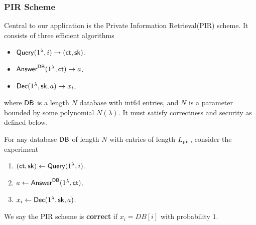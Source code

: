 \subsubsection{PIR Scheme}
\label{subsec:PIR}
Central to our application is the Private Information Retrieval(PIR) scheme. It consists of three efficient algorithms
\begin{itemize}
    \item $\mathsf{Query}(1^{\lambda}, i) \to (\mathsf{ct}, {\mathsf{sk}})$.
    \item $\mathsf{Answer}^{\mathsf{DB}}(1^{\lambda}, \mathsf{ct}) \to a$.
    \item $\mathsf{Dec}(1^{\lambda}, {\mathsf{sk}}, a) \to x_i$.
\end{itemize}
where $\mathsf{DB}$ is a length $N$ database with int64 entries, and $N$ is a parameter bounded by some polynomial $N(\lambda)$. It must satisfy correctness and security as defined below.
\begin{definition}
\label{defn:PIR-correctness}
For any database $\mathsf{DB}$ of length $N$ with entries of length $L_{\text{pir}}$, consider the experiment
\begin{enumerate}
    \item $(\mathsf{ct}, {\mathsf{sk}}) \leftarrow \mathsf{Query}(1^{\lambda}, i)$.
    \item $a \leftarrow \mathsf{Answer}^{\mathsf{DB}}(1^{\lambda}, \mathsf{ct})$.
    \item $x_i \leftarrow \mathsf{Dec}(1^{\lambda}, {\mathsf{sk}}, a)$.
\end{enumerate}
We say the PIR scheme is \textbf{correct} if $x_i = DB[i]$ with probability $1$.
\end{definition}
